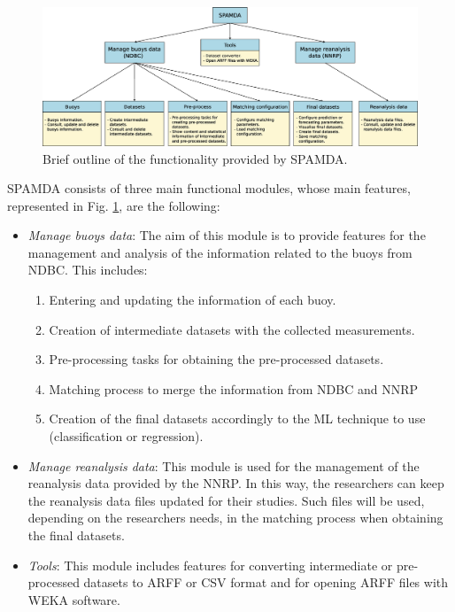\documentclass[review]{elsarticle}
\begin{document}
		\begin{figure}[ht!]
			\centering
			\includegraphics[scale=0.32]{figures/FigureSPAMDA.eps}
			\caption{Brief outline of the functionality provided by SPAMDA.}
			\label{fig:SPAMDA}
		\end{figure}
		SPAMDA consists of three main functional modules, whose main features, represented in Fig. \ref{fig:SPAMDA}, are the following:
		\begin{itemize}
			
			
			\item \textit{Manage buoys data}: The aim of this module is to provide features for the management and analysis of the information related to the buoys from NDBC. This includes:
			\begin{enumerate}
				\item Entering and updating the information of each buoy.
				\item Creation of intermediate datasets with the collected measurements.
				\item Pre-processing tasks for obtaining the pre-processed datasets.
				\item Matching process to merge the information from NDBC and NNRP
				\item Creation of the final datasets accordingly to the ML technique to use (classification or regression).
			\end{enumerate}
			
			\item \textit{Manage reanalysis data}: This module is used for the management of the reanalysis data provided by the NNRP. In this way, the researchers can keep the reanalysis data files updated for their studies. Such files will be used, depending on the researchers needs, in the matching process when obtaining the final datasets.
			
			\item \textit{Tools}: This module includes features for converting intermediate or pre-processed datasets to ARFF or CSV format and for opening ARFF files with WEKA software.
			
		\end{itemize}
\end{document}
